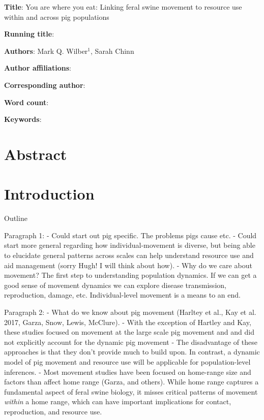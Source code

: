 \documentclass[a4paper]{article}
\begin{document}
\noindent
\textbf{Title}: You are where you eat:  Linking feral swine movement to resource use within and across pig populations

\bigskip

\noindent
\textbf{Running title}:

\bigskip

\noindent
\textbf{Authors}: Mark Q. Wilber$^1$, Sarah Chinn

\bigskip

\noindent
\textbf{Author affiliations}: \\

\bigskip

\noindent
\textbf{Corresponding author}:

\bigskip

\noindent
\textbf{Word count}:

\bigskip

\noindent
\textbf{Keywords}:

\newpage

\doublespacing
\linenumbers

\section*{Abstract}

\section*{Introduction}

Outline

Paragraph 1: 
	- Could start out pig specific.  The problems pigs cause etc.
	- Could start more general regarding how individual-movement is diverse, but being able to elucidate general patterns across scales can help understand resource use and aid management (sorry Hugh! I will think about how).
	- Why do we care about movement? The first step to understanding population dynamics.  If we can get a good sense of movement dynamics we can explore disease transmission, reproduction, damage, etc. Individual-level movement is a means to an end. 

Paragraph 2:
	- What do we know about pig movement (Harltey et al., Kay et al. 2017, Garza, Snow, Lewis, McClure).
	- With the exception of Hartley and Kay, these studies focused on movement at the large scale pig movement and and did not explicitly account for the dynamic pig movement\?
	- The disadvantage of these approaches is that they don't provide much to build upon.  In contrast, a dynamic model of pig movement and resource use will be applicable for population-level inferences. 
	-  Most movement studies have been focused on home-range size and factors than affect home range (Garza, and others).  While home range captures a fundamental aspect of feral swine biology, it misses critical patterns of movement \emph{within} a home range, which can have important implications for contact, reproduction, and resource use. 
\end{document}
